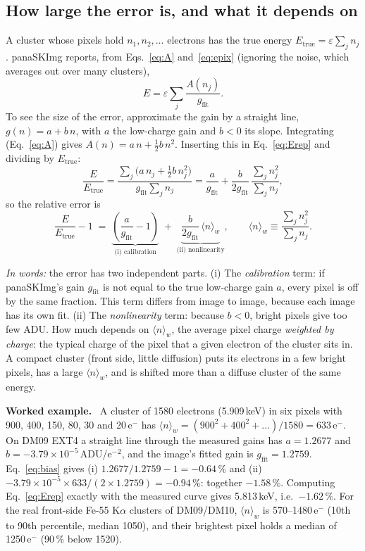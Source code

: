 \documentclass[11pt,a4paper]{article}
\newcommand{\eminus}{e$^-$}
\newcommand{\gfit}{g_{\mathrm{fit}}}
\newenvironment{example}%
  {\par\smallskip\noindent\begin{lrbox}{\exbox}\begin{minipage}{0.96\linewidth}\small\textbf{Worked example.}\ }%
  {\end{minipage}\end{lrbox}\colorbox{black!6}{\usebox{\exbox}}\par\smallskip}
\newcommand{\inwords}[1]{\par\noindent\textit{In words:} #1\par}
\begin{document}
\subsection{How large the error is, and what it depends on}
\label{sec:bias}
A cluster whose pixels hold $n_1, n_2, \dots$ electrons has the true energy
$E_{\mathrm{true}} = \varepsilon \sum_j n_j$. panaSKImg reports, from Eqs.~\ref{eq:A} and~\ref{eq:epix}
(ignoring the noise, which averages out over many clusters),
\begin{equation}
E = \varepsilon \sum_j \frac{A(n_j)}{\gfit} .
\label{eq:Erep}
\end{equation}
To see the size of the error, approximate the gain by a straight line, $g(n) = a + b\,n$, with $a$
the low-charge gain and $b<0$ its slope. Integrating (Eq.~\ref{eq:A}) gives
$A(n) = a\,n + \tfrac{1}{2}b\,n^2$. Inserting this in Eq.~\ref{eq:Erep} and dividing by $E_{\mathrm{true}}$:
\begin{equation}
\frac{E}{E_{\mathrm{true}}} = \frac{\sum_j \big(a\,n_j + \tfrac12 b\,n_j^2\big)}{\gfit\sum_j n_j}
= \frac{a}{\gfit} + \frac{b}{2\gfit}\,\frac{\sum_j n_j^2}{\sum_j n_j},
\end{equation}
so the relative error is
\begin{equation}
\frac{E}{E_{\mathrm{true}}} - 1 \;=\; \underbrace{\left(\frac{a}{\gfit} - 1\right)}_{\text{(i) calibration}}
\;+\; \underbrace{\frac{b}{2\gfit}\,\langle n\rangle_w}_{\text{(ii) nonlinearity}},
\qquad
\langle n\rangle_w \equiv \frac{\sum_j n_j^2}{\sum_j n_j} .
\label{eq:bias}
\end{equation}
\inwords{the error has two independent parts.
(i) The \emph{calibration} term: if panaSKImg's gain $\gfit$ is not equal to the true low-charge gain
$a$, every pixel is off by the same fraction. This term differs from image to image, because each
image has its own fit. (ii) The \emph{nonlinearity} term: because $b<0$, bright pixels give too few ADU.
How much depends on $\langle n\rangle_w$, the average pixel charge \emph{weighted by charge}: the typical
charge of the pixel that a given electron of the cluster sits in. A compact cluster (front side,
little diffusion) puts its electrons in a few bright pixels, has a large $\langle n\rangle_w$, and is
shifted more than a diffuse cluster of the same energy.}

\begin{example}
A cluster of 1580 electrons (5.909\,keV) in six pixels with 900, 400, 150, 80, 30 and 20\,\eminus{}
has $\langle n\rangle_w = (900^2 + 400^2 + \dots)/1580 = 633$\,\eminus. On DM09 EXT4 a straight line
through the measured gains has $a = 1.2677$ and $b = -3.79\times10^{-5}$\,ADU/\eminus$^2$, and the
image's fitted gain is $\gfit = 1.2759$. Eq.~\ref{eq:bias} gives (i) $1.2677/1.2759 - 1 = -0.64\,\%$ and
(ii) $-3.79\times10^{-5}\times 633/(2\times1.2759) = -0.94\,\%$: together $-1.58\,\%$. Computing
Eq.~\ref{eq:Erep} exactly with the measured curve gives 5.813\,keV, i.e.\ $-1.62\,\%$. For the real
front-side Fe-55 K$\alpha$ clusters of DM09/DM10, $\langle n\rangle_w$ is 570--1480\,\eminus{} (10th to 90th
percentile, median 1050), and their brightest pixel holds a median of 1250\,\eminus{} (90\,\% below 1520).
\end{example}
\end{document}
